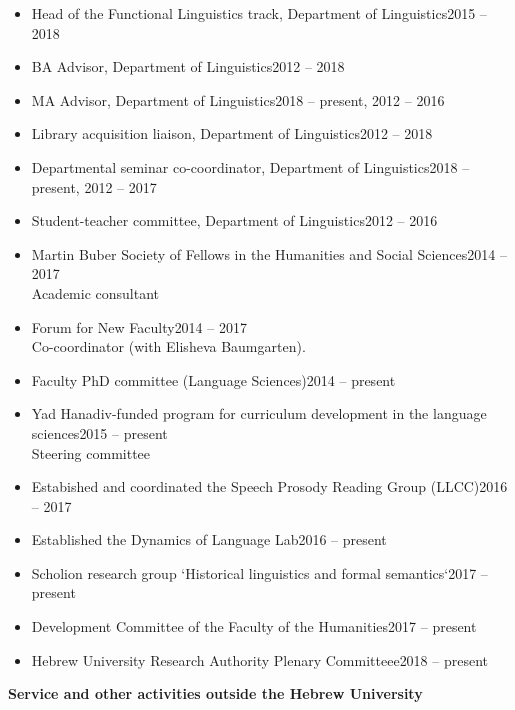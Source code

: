 \documentclass[letterpaper,11pt]{article}
\newcommand{\resheading}[1]{
\vspace*{6pt}
{\large \colorbox{mygrey}{\begin{minipage}{\textwidth}{\textbf{#1 \vphantom{p\^{E}}}}\end{minipage}}}
}
\begin{document}
\begin{itemize}
\vspace{-0.025 in}
\vspace*{-2pt}
\item {Head of the Functional Linguistics track, Department of 				Linguistics}\hfill{2015 -- 2018} 
\item
{BA Advisor, Department of Linguistics}\hfill{2012 -- 2018}
\item
{MA Advisor, Department of Linguistics}\hfill{2018 -- present, 2012 -- 2016}
\item
{Library acquisition liaison, Department of Linguistics}\hfill{2012 -- 2018}
\item {Departmental seminar co-coordinator, Department of Linguistics}\hfill{2018 -- present, 2012 -- 2017}
\item {Student-teacher committee, Department of Linguistics}\hfill{2012 -- 2016}
\item Martin Buber Society of Fellows in the Humanities and Social Sciences\hfill{2014 -- 2017}\\Academic consultant 
\item Forum for New Faculty\hfill{2014 -- 2017}\\Co-coordinator (with Elisheva Baumgarten).
\item Faculty PhD committee (Language Sciences)\hfill{2014 -- present}
\item Yad Hanadiv-funded program for curriculum development in the language sciences\hfill{2015 -- present}\\Steering committee
\item Estabished and coordinated the Speech Prosody Reading Group (LLCC)\hfill{2016 -- 2017}\\
\item Established the Dynamics of Language Lab\hfill{2016 -- present}
\item Scholion research group {`Historical linguistics and formal semantics`}\hfill{2017 -- present}
\item Development Committee of the Faculty of the 				Humanities\hfill{2017 -- present}
\item Hebrew University Research Authority Plenary Committeee\hfill{2018 -- present}
\end{itemize}
\newpage
\resheading{Service and other activities outside the Hebrew University} 
\end{document}
